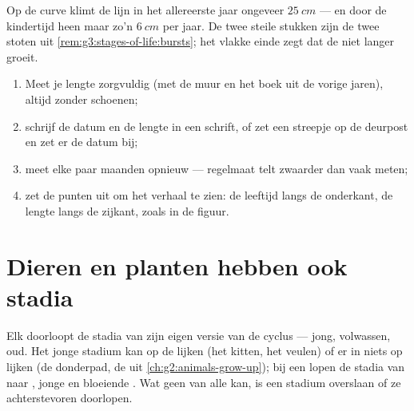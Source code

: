 \begin{example}\label{ex:g3:stages-of-life:reading}
Op de curve klimt de lijn in het allereerste jaar ongeveer
$\qty{25}{cm}$ --- en door de kindertijd heen maar zo'n
$\qty{6}{cm}$ per jaar. De twee steile stukken zijn de twee stoten uit
\cref{rem:g3:stages-of-life:bursts}; het vlakke einde zegt dat de
 niet langer groeit.
\end{example}

\begin{method}\label{met:g3:stages-of-life:keep}
\begin{enumerate}
  \item Meet je lengte zorgvuldig (met de muur en het boek uit de
        vorige jaren), altijd zonder schoenen;
  \item schrijf de datum en de lengte in een schrift, of zet een
        streepje op de deurpost en zet er de datum bij;
  \item meet elke paar maanden opnieuw --- regelmaat telt zwaarder dan
        vaak meten;
  \item zet de punten uit om het verhaal te zien: de leeftijd langs de
        onderkant, de lengte langs de zijkant, zoals in de figuur.
\end{enumerate}
\end{method}

\section{Dieren en planten hebben ook stadia}

\begin{proposition}\label{prop:g3:stages-of-life:animals}
Elk  doorloopt de stadia van zijn eigen versie van de
cyclus --- jong, volwassen, oud. Het jonge stadium kan op de 
lijken (het kitten, het veulen) of er in niets op lijken (de donderpad,
de  uit \cref{ch:g2:animals-grow-up}); bij een  lopen de
stadia van  naar , jonge  en bloeiende .
Wat geen van alle kan, is een stadium overslaan of ze achterstevoren
doorlopen.
\end{proposition}
\admitted

